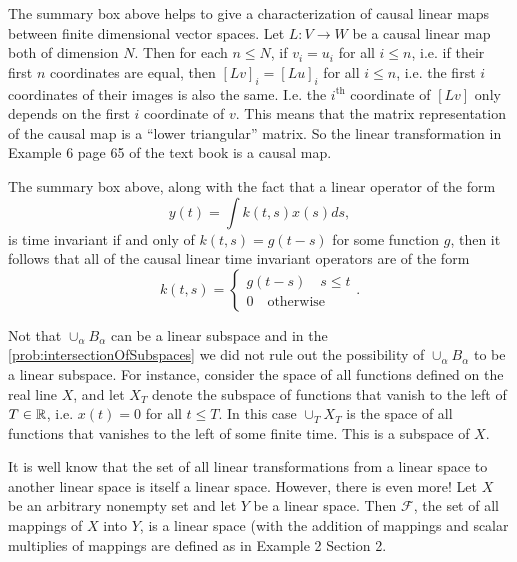 \begin{summary}
	The summary box above helps to give a characterization of causal linear maps between finite dimensional vector spaces. Let $ L:V\to W $ be a causal linear map both of dimension $ N $. Then for each $ n\leq N $, if $ v_i = u_i $ for all $ i\leq n $, i.e. if their first $ n $ coordinates are equal, then $ [Lv]_i = [Lu]_i $ for all $ i\leq n $, i.e. the first $ i $ coordinates of their images is also the same. I.e. the $ i^\text{th} $ coordinate of $ [Lv] $ only depends on the first $ i $ coordinate of $ v $. This means that the matrix representation of the causal map is a ``lower triangular'' matrix. So the linear transformation in Example 6 page 65 of the text book is a causal map.
\end{summary}


\begin{summary}
	The summary box above, along with the fact that a linear operator of the form
	\[ y(t) = \int k(t,s) x(s) ds, \]
	is time invariant if and only of $ k(t,s) = g(t-s) $ for some function $ g $, then it follows that all of the causal linear time invariant operators are of the form
	\[ k(t,s) = \begin{cases}
		g(t-s) \quad s\leq t \\
		0 \quad \text{otherwise}
	\end{cases}. \]
\end{summary}



\begin{summary}
	Not that $ \cup_\alpha B_\alpha $ can be a linear subspace and in the \autoref{prob:intersectionOfSubspaces} we did not rule out the possibility of $ \cup_\alpha B_\alpha $ to be a linear subspace. For instance, consider the space of all functions defined on the real line $ X $, and let $ X_T $ denote the subspace of functions that vanish to the left of $ T\in\mathbb{R} $, i.e. $ x(t) = 0 $ for all $ t\leq T $. In this case $ \cup_T X_T $ is the space of all functions that vanishes to the left of some finite time. This is a subspace of $ X $.
\end{summary}


\begin{summary}
	It is well know that the set of all linear transformations from a linear space to another linear space is itself a linear space. However, there is even more! Let $ X $ be an arbitrary nonempty set and let $ Y $  be a linear space. Then $ \mathcal{F} $, the set of all mappings of $ X $ into $ Y $, is a linear space (with the addition of mappings and scalar multiplies of mappings are defined as in Example 2 Section 2. 
\end{summary}


